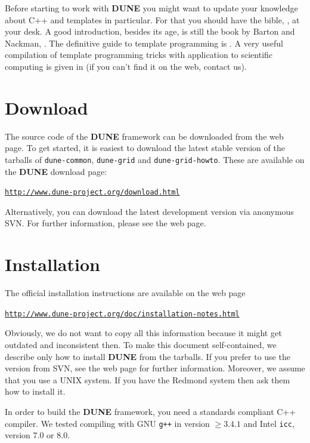 \documentclass[11pt,a4paper,headinclude,footinclude,DIV16,normalheadings]{scrreprt}
\newcommand{\Dune}{{\sf\bfseries DUNE}\xspace}
\begin{document}
Before starting to work with \Dune{} you might want to update your
knowledge about C++ and templates in particular. For that you should
have the bible, \cite{Stroustrup}, at your desk. A good introduction,
besides its age, is still the book by Barton and Nackman,
\cite{BN}. The definitive guide to template programming is
\cite{VandervoordeJosuttis}. A very useful compilation of template
programming tricks with application to scientific computing is given
in \cite{Veldhui99} (if you can't find it on the web, contact us).

\section{Download}

The source code of the \Dune{} framework can be
downloaded from the web page.  To get started, it is easiest to
download the latest stable version of the tarballs of
\texttt{dune-common}, \texttt{dune-grid} and \texttt{dune-grid-howto}.
These are available on the \Dune{} download page:
%
\begin{center}
\href{http://www.dune-project.org/download.html}%
{\texttt{http://www.dune-project.org/download.html}}
\end{center}
%

Alternatively, you can download the latest development version via
anonymous SVN.  For further information, please see the web page.

\section{Installation}

The official installation instructions are available on the web page
%
\begin{center}
\href{http://www.dune-project.org/doc/installation-notes.html}%
{\texttt{http://www.dune-project.org/doc/installation-notes.html}}
\end{center}

Obviously, we do not want to copy all this information because it might
get outdated and inconsistent then. To make this document
self-contained, we describe only how to install \Dune{} from the
tarballs.  If you prefer to use the version from SVN, see the web page
for further information.  Moreover, we assume that you use a UNIX
system. If you have the Redmond system then ask them how to install
it.

In order to build the \Dune{} framework, you need a standards
compliant C++ compiler.  We tested compiling with GNU \texttt{g++} in
version $\geq 3.4.1$ and Intel \texttt{icc}, version 7.0 or 8.0.
\end{document}
